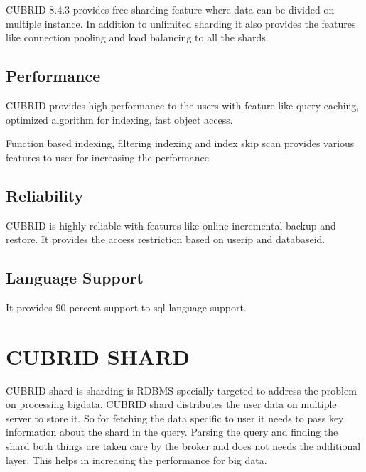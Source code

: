 \documentclass[9pt,twocolumn,twoside]{styles/osajnl}
\begin{document}
CUBRID 8.4.3 provides free sharding feature where data can be divided
on multiple instance.  In addition to unlimited sharding it also
provides the features like connection pooling and load balancing to
all the shards.

\subsection{Performance}

CUBRID provides high performance to the users with feature like query
caching, optimized algorithm for indexing, fast object access.

Function based indexing, filtering indexing and index skip scan
provides various features to user for increasing the performance

\subsection{Reliability}

CUBRID is highly reliable with features like online incremental backup
and restore.  It provides the access restriction based on userip and
databaseid.

\subsection{Language Support}
It provides 90 percent support to sql language support. 


\section{CUBRID SHARD}

CUBRID shard is sharding is RDBMS specially targeted to address the
problem on processing bigdata. CUBRID shard distributes the user data
on multiple server to store it. So for fetching the data specific to
user it needs to pass key information about the shard in the
query. Parsing the query and finding the shard both things are taken
care by the broker and does not needs the additional layer. This helps
in increasing the performance for big data. 

\newpage



 
\end{document}
